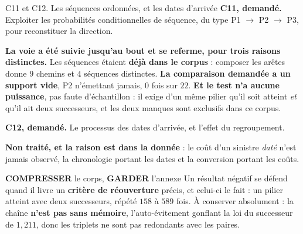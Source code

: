\documentclass[11pt]{beamer}
\newcommand{\garder}{\textbf{GARDER}}
\newcommand{\compresser}{\textbf{COMPRESSER}}
\newcommand{\srcs}[1]{\vspace{0.8mm}{\tiny\textcolor{gray!50!black}{Sources : #1}}}
\begin{document}
\begin{frame}{C11 et C12. Les séquences ordonnées, et les dates d'arrivée}
\scriptsize
\textbf{C11, demandé.} Exploiter les probabilités conditionnelles de séquence, du type
P1 $\rightarrow$ P2 $\rightarrow$ P3, pour reconstituer la direction.
\vspace{1mm}

\textbf{La voie a été suivie jusqu'au bout et se referme, pour trois raisons distinctes.} Les
séquences étaient \textbf{déjà dans le corpus} : composer les arêtes donne $9$ chemins et $4$
séquences distinctes. \textbf{La comparaison demandée a un support vide}, P2 n'émettant jamais,
$0$ fois sur $22$. \textbf{Et le test n'a aucune puissance}, pas faute d'échantillon : il exige
d'un même pilier qu'il soit atteint \emph{et} qu'il ait deux successeurs, et les deux manques
sont exclusifs dans ce corpus.
\vspace{1mm}

\textbf{C12, demandé.} Le processus des dates d'arrivée, et l'effet du regroupement.
\vspace{1mm}

\textbf{Non traité, et la raison est dans la donnée} : le coût d'un sinistre \emph{daté} n'est
jamais observé, la chronologie portant les dates et la conversion portant les coûts.
\begin{block}{\compresser{} le corps, \garder{} l'annexe}
Un résultat négatif se défend quand il livre un \textbf{critère de réouverture} précis, et
celui-ci le fait : un pilier atteint avec deux successeurs, répété $158$ à $589$ fois. À
conserver absolument : la chaîne \textbf{n'est pas sans mémoire}, l'auto-évitement gonflant la
loi du successeur de $1{,}211$, donc les triplets ne sont pas redondants avec les paires.
\end{block}
\srcs{script~\texttt{75}}
\end{frame}
\end{document}
